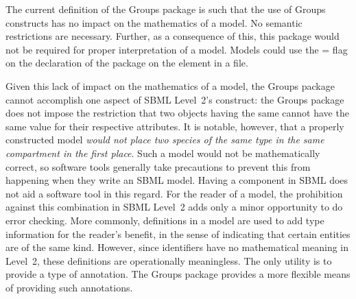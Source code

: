 The current definition of the Groups package is such that the use of Groups constructs has no impact on the mathematics of a model.  No semantic restrictions are necessary. Further, as a consequence of this, this package would not be required for proper interpretation of a model. Models could use the = flag on the declaration of the package on the  element in a file.

Given this lack of impact on the mathematics of a model, the Groups package cannot accomplish one aspect of SBML Level~2's \SpeciesType construct: the Groups package does not impose the restriction that two \Species objects having the same \SpeciesType cannot have the same value for their respective  attributes.  It is notable, however, that a properly constructed model \emph{would not place two species of the same type in the same compartment in the first place}.  Such a model would not be mathematically correct, so software tools generally take precautions to prevent this from happening when they write an SBML model.  Having a \SpeciesType component in SBML does not aid a software tool in this regard.  For the reader of a model, the prohibition against this combination in SBML Level~2 adds only a minor opportunity to do error checking.  More commonly, \SpeciesType definitions in a model are used to add type information for the reader's benefit, in the sense of indicating that certain entities are of the same kind.  However, since \SpeciesType identifiers have no mathematical meaning in Level~2, these definitions are operationally meaningless.  The only utility is to provide a type of annotation.  The Groups package provides a more flexible means of providing such annotations.

